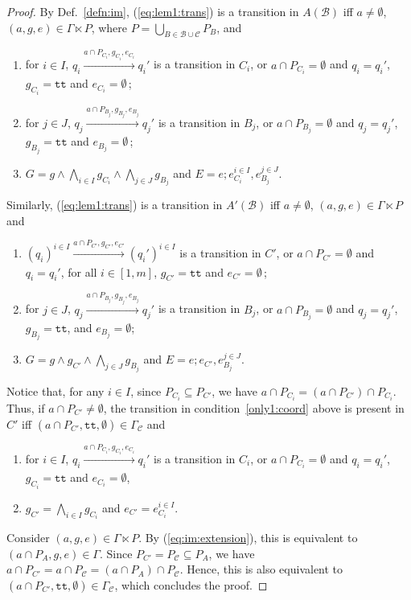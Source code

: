 \documentclass{llncs}
\newcommand{\defn}[1]{Def.~\ref{defn:#1}}
\newcommand{\eq}[1]{(\ref{eq:#1})}
\newcommand{\cB}{\ensuremath{\mathcal{B}}}
\newcommand{\cC}{\ensuremath{\mathcal{C}}}
\newcommand{\goesto}[2][]{\ensuremath{\xrightarrow[#1]{#2}}}
\newcommand{\true} {\ensuremath{\mathtt{t\!t}}}
\newcommand{\noop} {\ensuremath{\emptyset}} %
\newcommand{\IMextend}[2]{\ensuremath{#1 \ltimes #2}}
\newcounter{tempctr}
\newcommand{\breakenumistart}{%
  \setcounter{tempctr}{\value{enumi}}%
  \end{enumerate}%
}
\newcommand{\breakenumiend}{%
  \begin{enumerate}%
  \setcounter{enumi}{\value{tempctr}}%
}
\begin{document}
\begin{proof}
  By \defn{im}, \eq{lem1:trans} is a transition in $A(\cB)$
  iff $a \neq \emptyset$, $(a, g, e) \in \IMextend{\Gamma}{P}$,
  where $P = \bigcup_{B \in \cB \cup \cC} P_B$, and
  \begin{enumerate}
  \item for $i \in I$,
    $q_i \goesto{a \cap P_{C_i}, g_{C_i}, e_{C_i}} q_i'$
    is a transition in $C_i$, or
    $a \cap P_{C_i} = \emptyset$ and $q_i = q_i'$,
    $g_{C_i} = \true$ and $e_{C_i} = \noop$\,;
  \item for $j \in J$,
    $q_j \goesto{a \cap P_{B_j}, g_{B_j}, e_{B_j}} q_j'$
    is a transition in $B_j$, or
    $a \cap P_{B_j} = \emptyset$ and $q_j = q_j'$,
    $g_{B_j} = \true$ and $e_{B_j} = \noop$\,;
  \item $G = g \land \bigwedge_{i \in I} g_{C_i} \land
    \bigwedge_{j \in J} g_{B_j}$ and
    $E = e; e_{C_i}^{i \in I}, e_{B_j}^{j \in J}$.
  \end{enumerate}

  Similarly, \eq{lem1:trans} is a transition in
  $A'(\cB)$ iff $a \neq \emptyset$,
  $(a, g, e) \in \IMextend{\Gamma}{P}$ and
  \begin{enumerate}
  \item \label{only1:coord}
    $(q_i)^{i \in I}
    \goesto{a \cap P_{C'}, g_{C'}, e_{C'}}
    (q_i')^{i \in I}$ is a transition in $C'$,
    or $a \cap P_{C'} = \emptyset$ and $q_i = q_i'$,
    for all $i \in [1,m]$,
    $g_{C'} = \true$ and $e_{C'} = \noop$\,;
  \item for $j \in J$,
    $q_j \goesto{a \cap P_{B_j}, g_{B_j}, e_{B_j}} q_j'$
    is a transition in $B_j$, or
    $a \cap P_{B_j} = \emptyset$ and $q_j = q_j'$,
    $g_{B_j} = \true$, and $e_{B_j} = \noop$;
  \item $G = g \land g_{C'} \land
    \bigwedge_{j \in J} g_{B_j}$ and
    $E = e; e_{C'}, e_{B_j}^{j \in J}$.
%
  \breakenumistart
  Notice that, for any $i \in I$, since
  $P_{C_i} \subseteq P_{C'}$, we have
  $a \cap P_{C_i} = (a \cap P_{C'}) \cap P_{C_i}$.
  Thus, if $a \cap P_{C'} \neq \emptyset$, 
  the transition in condition~\ref{only1:coord} above is
  present in $C'$ iff
  $(a \cap P_{C'}, \true, \noop) \in \Gamma_\cC$ and
  \breakenumiend
% 
  \item for $i \in I$,
    $q_i \goesto{a \cap P_{C_i}, g_{C_i}, e_{C_i}} q_i'$
    is a transition in $C_i$, or $a \cap P_{C_i} = \emptyset$
    and $q_i = q_i'$,
    $g_{C_i} = \true$ and $e_{C_i} = \noop$,
  \item $g_{C'} = \bigwedge_{i \in I} g_{C_i}$ and
    $e_{C'} = e_{C_i}^{i \in I}$.
  \end{enumerate}

  Consider $(a,g,e) \in \IMextend{\Gamma}{P}$.  By
  \eq{im:extension}, this is equivalent to
  $(a \cap P_A, g, e) \in \Gamma$.
  Since $P_{C'} = P_\cC \subseteq P_A$, we have
  $a \cap P_{C'} = a \cap P_\cC = (a \cap P_A) \cap P_\cC$.
  Hence, this is also equivalent to
  $(a \cap P_{C'}, \true, \noop) \in \Gamma_\cC$,
  which concludes the proof.
\end{proof}
\end{document}
